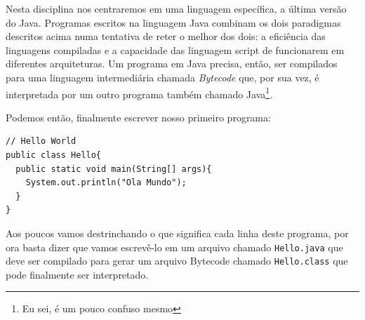 \begin{center}
\end{center}


Nesta disciplina nos centraremos em uma linguagem específica, a última versão do Java.
Programas escritos na linguagem Java combinam os dois paradigmas descritos acima numa tentativa de reter o melhor dos dois: a eficiência das linguagens compiladas e a capacidade das linguagem script de funcionarem em diferentes arquiteturas.
Um programa em Java precisa, então, ser compilados para uma linguagem intermediária chamada {\em Bytecode} que, por sua vez, é interpretada por um outro programa também chamado Java\footnote{Eu sei, é um pouco confuso mesmo}.

\begin{center}
\end{center}

Podemos então, finalmente escrever nosso primeiro programa:

\begin{lstlisting}
// Hello World
public class Hello{
  public static void main(String[] args){
    System.out.println("Ola Mundo");
  }
}
\end{lstlisting}

Aos poucos vamos destrinchando o que significa cada linha deste programa, por ora basta dizer que vamos escrevê-lo em um arquivo chamado {\tt Hello.java} que deve ser compilado para gerar um arquivo Bytecode chamado {\tt Hello.class} que pode finalmente ser interpretado.

\begin{center}
\end{center}




